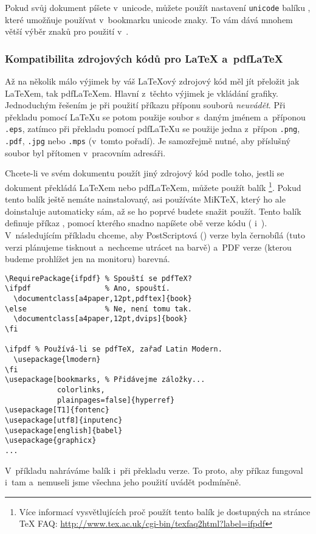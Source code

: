 Pokud svůj dokument píšete v~unicode, můžete použít nastavení 
\verb+unicode+ balíku , které umožňuje používat
v~bookmarku unicode znaky. To vám dává mnohem větší výběr znaků
pro použití v~.

\subsubsection{Kompatibilita zdrojových kódů pro \LaTeX{} a~pdf\LaTeX{}}
\label{sec:pdfcompat}

Až na několik %
málo výjimek by váš \LaTeX ový zdrojový kód měl jít přeložit
jak \LaTeX em, tak pdf\LaTeX em. Hlavní z~těchto
výjimek je vkládání grafiky. Jednoduchým řešením je
při použití příkazu  příponu souborů \emph{neuvádět}.
Při překladu pomocí  \LaTeX u
se potom použije soubor s~daným jménem a~příponou \texttt{.eps},
zatímco při překladu pomocí pdf\LaTeX u se použije jedna z~přípon
\texttt{.png}, \texttt{.pdf}, \texttt{.jpg} nebo \texttt{.mps}
(v~tomto pořadí). Je samozřejmě nutné, aby příslušný soubor byl
přítomen v~pracovním adresáři.

Chcete-li ve svém dokumentu použít jiný zdrojový kód podle toho,
jestli se dokument překládá \LaTeX em nebo pdf\LaTeX em, můžete
použít balík \hbox{}%
\footnote{Více informací vysvětlujících proč použít tento
   balík je dostupných na stránce \TeX{} FAQ:
   \url{http://www.tex.ac.uk/cgi-bin/texfaq2html?label=ifpdf}}.
Pokud tento balík ještě nemáte nainstalovaný, asi používáte
MiK\TeX{}, který ho ale doinstaluje automaticky sám, až se ho
poprvé budete snažit použít. Tento balík definuje příkaz
, pomocí kterého snadno napíšete obě verze kódu
( i~). V~následujícím
příkladu chceme, aby PostScriptová () verze byla
černobílá (tuto verzi plánujeme tisknout a~nechceme utrácet
na barvě) a~PDF verze (kterou budeme prohlížet jen na monitoru)
barevná.
\begin{code}
\begin{verbatim}
\RequirePackage{ifpdf} % Spouští se pdfTeX?
\ifpdf                 % Ano, spouští.
  \documentclass[a4paper,12pt,pdftex]{book}
\else                  % Ne, není tomu tak.
  \documentclass[a4paper,12pt,dvips]{book}
\fi

\ifpdf % Používá-li se pdfTeX, zařaď Latin Modern.
  \usepackage{lmodern}
\fi
\usepackage[bookmarks, % Přidávejme záložky...
            colorlinks,
            plainpages=false]{hyperref}                    
\usepackage[T1]{fontenc}
\usepackage[utf8]{inputenc}
\usepackage[english]{babel}
\usepackage{graphicx}
...
\end{verbatim}
\end{code}
V~příkladu nahráváme balík  i~při překladu
 verze. To proto, aby příkaz  fungoval i~tam
a~nemuseli jsme všechna jeho použití uvádět podmíněně.

